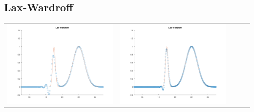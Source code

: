 \documentclass{article}
\begin{document}
\subsection{Lax-Wardroff}
\begin{table}[h]
    \centering
        \begin{tabular}{ccccc}
            \includegraphics[scale = 0.17]{LW.png} & \includegraphics[scale = 0.17]{LW2.png} \\

\end{tabular}
\end{table}
\end{document}
